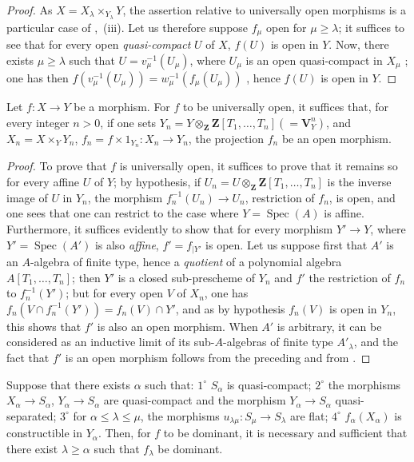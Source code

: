 \begin{proof}
As $X=X_\lambda\times_{Y_\lambda}Y$, the assertion relative to universally open morphisms is a particular case of ,~(iii).
Let us therefore suppose $f_\mu$ open for $\mu\geqslant\lambda$; it suffices to see that for every open \emph{quasi-compact} $U$ of $X$, $f(U)$ is open in $Y$.
Now, there exists $\mu\geqslant\lambda$ such that $U=v_\mu^{-1}(U_\mu)$, where $U_\mu$ is an open quasi-compact in $X_\mu$ ; one has then $f(v_\mu^{-1}(U_\mu))=w_\mu^{-1}(f_\mu(U_\mu))$ , hence $f(U)$ is open in $Y$.
\end{proof}

\begin{corollary}[8.10.2]
\label{IV.8.10.2}
Let $f:X\to Y$ be a morphism.
For $f$ to be universally open, it suffices that, for every integer $n>0$, if one sets $Y_n=Y\otimes_\mathbf{Z}\mathbf{Z}[T_1,\ldots,T_n](=\mathbf{V}_Y^n)$, and $X_n=X\times_Y Y_n$, $f_n=f\times 1_{Y_n}:X_n\to Y_n$, the projection $f_n$ be an open morphism.
\end{corollary}

\begin{proof}
To prove that $f$ is universally open, it suffices to prove that it remains so for every affine $U$ of $Y$; by hypothesis, if $U_n=U\otimes_\mathbf{Z}\mathbf{Z}[T_1,\ldots,T_n]$ is the inverse image of $U$ in $Y_n$, the morphism $f_n^{-1}(U_n)\to U_n$, restriction of $f_n$, is open, and one sees that one can restrict to the case where $Y=\operatorname{Spec}(A)$ is affine.
Furthermore, it suffices evidently to show that for every morphism $Y'\to Y$, where $Y'=\operatorname{Spec}(A')$ is also \emph{affine}, $f'=f_{|Y'}$ is open.
Let us suppose first that $A'$ is an $A$-algebra of finite type, hence a \emph{quotient} of a polynomial algebra $A[T_1,\ldots,T_n]$; then $Y'$ is a closed sub-prescheme of $Y_n$ and $f'$ the restriction
of $f_n$ to $f_n^{-1}(Y')$; but for every open $V$ of $X_n$, one has $f_n(V\cap f_n^{-1}(Y'))=f_n(V)\cap Y'$, and as by hypothesis $f_n(V)$ is open in $Y_n$, this shows that $f'$ is also an open morphism.
When $A'$ is arbitrary, it can be considered as an inductive limit of its sub-$A$-algebras of finite type $A'_\lambda$, and the fact that $f'$ is an open morphism follows from the preceding and from .
\end{proof}

\begin{proposition}[8.10.3]
\label{IV.8.10.3}
Suppose that there exists $\alpha$ such that: $1^\circ$ $S_\alpha$ is quasi-compact; $2^\circ$ the morphisms $X_\alpha\to S_\alpha$, $Y_\alpha\to S_\alpha$ are quasi-compact and the morphism $Y_\alpha\to S_\alpha$ quasi-separated; $3^\circ$ for $\alpha\leqslant\lambda\leqslant\mu$, the morphisms $u_{\lambda\mu}:S_\mu\to S_\lambda$ are flat; $4^\circ$ $f_\alpha(X_\alpha)$ is constructible in $Y_\alpha$.
Then, for $f$ to be dominant, it is necessary and sufficient that there exist $\lambda\geqslant\alpha$ such that $f_\lambda$ be dominant.
\end{proposition}

